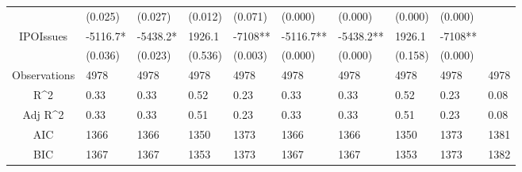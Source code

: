 \documentclass{article}
\begin{document}
\begin{table}[H]
\begin{tabular}{|clllllllll|}
   & (0.025) & (0.027) & (0.012) & (0.071) & (0.000) & (0.000) & (0.000) & (0.000) &  \\ 
  IPOIssues & -5116.7* & -5438.2* & 1926.1 & -7108** & -5116.7** & -5438.2** & 1926.1 & -7108** &  \\ 
   & (0.036) & (0.023) & (0.536) & (0.003) & (0.000) & (0.000) & (0.158) & (0.000) &  \\ 
  \hline 
 Observations & 4978 & 4978 & 4978 & 4978 & 4978 & 4978 & 4978 & 4978 & 4978 \\ 
  R^2 & 0.33 & 0.33 & 0.52 & 0.23 & 0.33 & 0.33 & 0.52 & 0.23 & 0.08 \\ 
  Adj R^2 & 0.33 & 0.33 & 0.51 & 0.23 & 0.33 & 0.33 & 0.51 & 0.23 & 0.08 \\ 
  AIC & 1366 & 1366 & 1350 & 1373 & 1366 & 1366 & 1350 & 1373 & 1381 \\ 
  BIC & 1367 & 1367 & 1353 & 1373 & 1367 & 1367 & 1353 & 1373 & 1382 \\ 
   \hline
\end{tabular}
 
\end{table}
\end{document}
